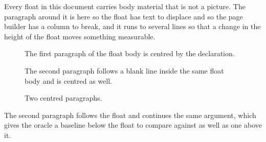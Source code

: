 \documentclass{article}
\begin{document}
Every float in this document carries body material that is not a
picture. The paragraph around it is here so the float has text to displace and
so the page builder has a column to break, and it runs to several lines so that
a change in the height of the float moves something measurable.

\begin{figure}[h]
\centering
The first paragraph of the float body is centred by the declaration.

The second paragraph follows a blank line inside the same float body and is centred as well.
\caption{Two centred paragraphs.}
\end{figure}

The second paragraph follows the float and continues the same
argument, which gives the oracle a baseline below the float to compare against
as well as one above it.
\end{document}
